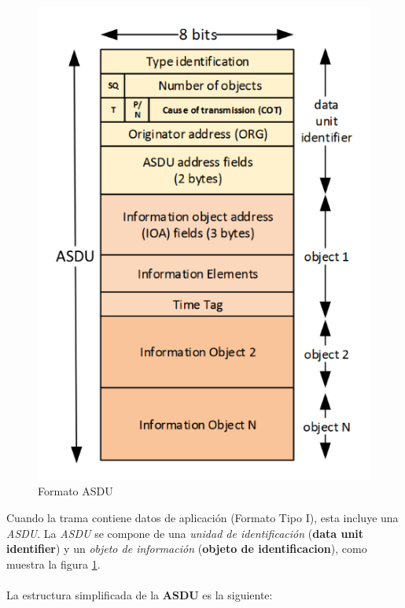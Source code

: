\documentclass[a5paper]{book}%
\begin{document}
\begin{figure}[H]
	\centering
	\caption{Formato ASDU}
	\label{fig:formatoasdu}
	\includegraphics[width=0.7\linewidth]{formato_ASDU}
\end{figure}


Cuando la trama contiene datos de aplicación (Formato Tipo I), esta incluye una \textit{ASDU}. La \textit{ASDU} se compone de una \textit{unidad de identificación} (\textbf{data unit identifier}) y un \textit{objeto de información} (\textbf{objeto de identificacion}),  como muestra la figura \ref{fig:formatoasdu}.\\\\

La estructura simplificada de la \textbf{ASDU} es la siguiente:
\end{document}
